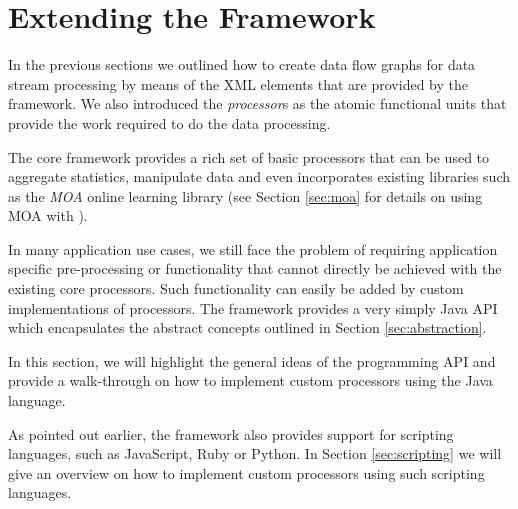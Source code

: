 \section{\label{sec:extendingStreams}Extending the \streams Framework}
In the previous sections we outlined how to create data flow graphs for
data stream processing by means of the XML elements that are provided
by the \streams framework. We also introduced the {\em processor}s as
the atomic functional units that provide the work required to do the
data processing.

The core \streams framework provides a rich set of basic processors that
can be used to aggregate statistics, manipulate data and even incorporates
existing libraries such as the {\em MOA} online learning library (see
Section \ref{sec:moa} for details on using MOA with \streams).

In many application use cases, we still face the problem of requiring
application specific pre-processing or functionality that cannot directly be 
achieved with the existing \streams core processors. Such functionality
can easily be added by custom implementations of processors. The \streams
framework provides a very simply Java API which encapsulates the abstract
concepts outlined in Section \ref{sec:abstraction}.

\medskip

In this section, we will highlight the general ideas of the \streams
programming API and provide a walk-through on how to implement custom
processors using the Java language. 

As pointed out earlier, the \streams framework also provides support
for scripting languages, such as JavaScript, Ruby or Python. In Section
\ref{sec:scripting} we will give an overview on how to implement custom
processors using such scripting languages.






%